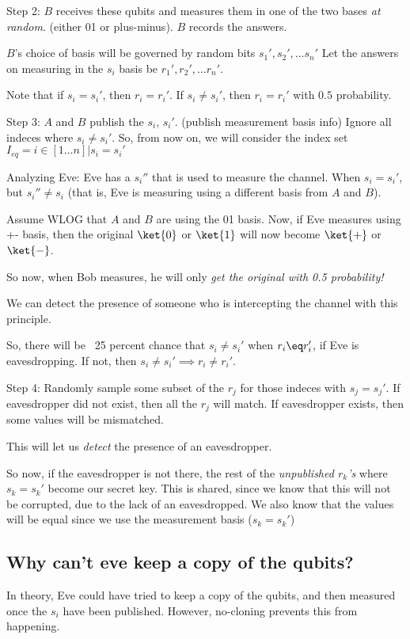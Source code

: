 \documentclass[11pt]{article}
\begin{document}
Step 2: $B$ receives these qubits and measures them in one of the two bases
\textit{at random}. (either 01 or plus-minus). $B$ records the answers.

$B$'s choice of basis will be governed by random bits $s_1', s_2', \dots s_n'$
Let the answers on measuring in the $s_i$ basis be $r_1', r_2', \dots r_n'$. 


Note that if $s_i = s_i'$, then $r_i = r_i'$. If $s_i \neq s_i'$, then
$r_i = r_i'$ with $0.5$ probability.



Step 3: $A$ and $B$ publish the $s_i$, $s_i'$. (publish measurement basis info)
Ignore all indeces where $s_i \neq s_i'$. So, from now on, we will consider
the index set $I_{eq} = { i \in [1\dots n] \vert  s_i = s_i' }$

Analyzing Eve: Eve has a $s_i''$ that is used to measure the channel.
When $s_i = s_i'$, but $s_i'' \neq s_i$ (that is, Eve is measuring using a 
different basis from $A$ and $B$).

Assume WLOG that $A$ and $B$ are using the 01 basis. Now, if Eve measures
using +- basis, then the original $\ket{0}$ or $\ket{1}$ will now become
$\ket{+}$ or $\ket{-}$.

So now, when Bob measures, he will only \textit{get the original with 0.5 probability!}

We can detect the presence of someone who is intercepting the channel
with this principle.


So, there will be ~25 percent chance that $s_i \neq s_i'$ when $r_i \eq r_i'$, if
Eve is eavesdropping. If not, then $s_i \neq s_i' \implies r_i \neq r_i'$.

Step 4: Randomly sample some subset of the $r_j$ for those indeces with $s_j = s_j'$.
If eavesdropper did not exist, then all the $r_j$  will match. If eavesdropper
exists, then some values will be mismatched.

This will let us \textit{detect} the presence of an eavesdropper.

So now, if the eavesdropper is not there, the rest of the
\textit{unpublished $r_k$'s} where $s_k = s_k'$ become
our secret key. This is shared, since we know that this will not
be corrupted, due to the lack of an eavesdropped. We also know that the
values will be equal since we use the measurement basis ($s_k = s_k'$)


\subsection{Why can't eve keep a copy of the qubits?}
In theory, Eve could have tried to keep a copy of the qubits, and then measured
once the $s_i$ have been published. However, no-cloning prevents this from happening.
\end{document}
